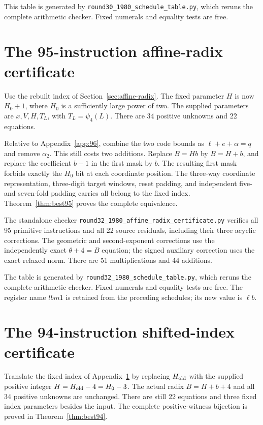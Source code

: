 \documentclass[11pt,letterpaper]{article}
\theoremstyle{definition}
\theoremstyle{remark}
\numberwithin{equation}{section}
\newcommand{\file}[1]{\texttt{#1}}
\begin{document}
This table is generated by \file{round30\_1980\_schedule\_table.py},
which reruns the complete arithmetic checker. Fixed numerals and
equality tests are free.

\small


\clearpage\normalsize
\section{The 95-instruction affine-radix certificate}\label{app:95}

Use the rebuilt index of Section~\ref{sec:affine-radix}. The fixed
parameter $H$ is now $H_0+1$, where $H_0$ is a sufficiently large
power of two. The supplied parameters are $x,V,H,T_L$, with
$T_L=\psi_4(L)$. There are 34 positive unknowns and 22 equations.

Relative to Appendix~\ref{app:96}, combine the two code bounds as
$\ell+e+\alpha=q$ and remove $\alpha_2$. This still costs two additions.
Replace $B=Hb$ by $B=H+b$, and replace the coefficient $b-1$ in the
first mask by $b$. The resulting first mask forbids exactly the
$H_0$ bit at each coordinate position. The three-way coordinate
representation, three-digit target windows, reset padding, and
independent five- and seven-fold padding carries all belong to the
fixed index. Theorem~\ref{thm:best95} proves the complete equivalence.

The standalone checker \file{round32\_1980\_affine\_radix\_certificate.py}
verifies all 95 primitive instructions and all 22 source residuals,
including their three acyclic corrections. The geometric and
second-exponent corrections use the independently exact
$\theta+4=B$ equation; the signed auxiliary correction uses the
exact relaxed norm. There are 51 multiplications and 44 additions.

The table is generated by \file{round32\_1980\_schedule\_table.py}, which
reruns the complete arithmetic checker. Fixed numerals and equality
tests are free. The register name $\mathit{lbm1}$ is retained from
the preceding schedules; its new value is $\ell b$.

\small


\clearpage\normalsize
\section{The 94-instruction shifted-index certificate}\label{app:94}

Translate the fixed index of Appendix~\ref{app:95} by replacing
$H_{\rm old}$ with the supplied positive integer $H=H_{\rm old}-4=H_0-3$.
The actual radix $B=H+b+4$ and all 34 positive unknowns are unchanged.
There are still 22 equations and three fixed index parameters besides
the input. The complete positive-witness bijection is proved in
Theorem~\ref{thm:best94}.
\end{document}
